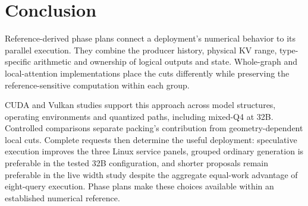 \section{Conclusion}
Reference-derived phase plans connect a deployment's numerical behavior to its parallel execution. They combine the producer history, physical KV range, type-specific arithmetic and ownership of logical outputs and state. Whole-graph and local-attention implementations place the cuts differently while preserving the reference-sensitive computation within each group.

CUDA and Vulkan studies support this approach across model structures, operating environments and quantized paths, including mixed-Q4 at 32B. Controlled comparisons separate packing's contribution from geometry-dependent local cuts. Complete requests then determine the useful deployment: speculative execution improves the three Linux service panels, grouped ordinary generation is preferable in the tested 32B configuration, and shorter proposals remain preferable in the live width study despite the aggregate equal-work advantage of eight-query execution. Phase plans make these choices available within an established numerical reference.
